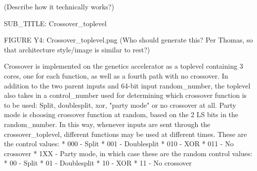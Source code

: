 (Describe how it technically works?)

SUB_TITLE: Crossover_toplevel

FIGURE Y4: Crossover_toplevel.png (Who should generate this? Per Thomas, so that architecture style/image is similar to rest?)

Crossover is implemented on the genetics accelerator as a toplevel containing 3 cores, one for each function, as well as a fourth path with no crossover. In addition to the two parent inputs and 64-bit input random_number, the toplevel also takes in a control_number used for determining which crossover function is to be used: Split, doublesplit, xor, "party mode" or no crossover at all. Party mode is choosing crossover function at random, based on the 2 LS bits in the random_number. In this way, whenever inputs are sent through the crossover_toplevel, different functions may be used at different times. These are the control values:
* 000 - Split
* 001 - Doublesplit
* 010 - XOR
* 011 - No crossover
* 1XX - Party mode, in which case these are the random control values:
    * 00 - Split
    * 01 - Doublesplit
    * 10 - XOR
    * 11 - No crossover